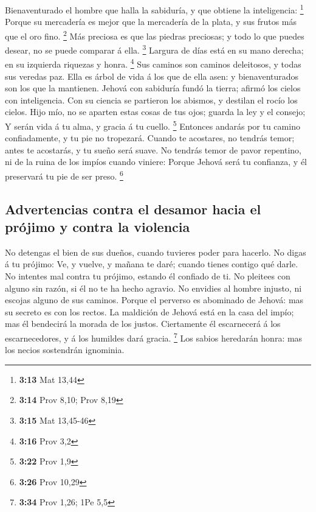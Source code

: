  Bienaventurado el hombre que halla la sabiduría, y que
obtiene la inteligencia: \footnote{\textbf{3:13} Mat 13,44}
 Porque su mercadería es mejor que la mercadería de la
plata, y sus frutos más que el oro fino. \footnote{\textbf{3:14} Prov
  8,10; Prov 8,19}  Más preciosa es que las piedras
preciosas; y todo lo que puedes desear, no se puede comparar á ella.
\footnote{\textbf{3:15} Mat 13,45-46}  Largura de días está
en su mano derecha; en su izquierda riquezas y honra. \footnote{\textbf{3:16}
  Prov 3,2}  Sus caminos son caminos deleitosos, y todas
sus veredas paz.  Ella es árbol de vida á los que de ella
asen: y bienaventurados son los que la mantienen.  Jehová
con sabiduría fundó la tierra; afirmó los cielos con inteligencia.
 Con su ciencia se partieron los abismos, y destilan el
rocío los cielos.  Hijo mío, no se aparten estas cosas de
tus ojos; guarda la ley y el consejo;  Y serán vida á tu
alma, y gracia á tu cuello. \footnote{\textbf{3:22} Prov 1,9}
 Entonces andarás por tu camino confiadamente, y tu pie no
tropezará.  Cuando te acostares, no tendrás temor; antes te
acostarás, y tu sueño será suave.  No tendrás temor de
pavor repentino, ni de la ruina de los impíos cuando viniere:
 Porque Jehová será tu confianza, y él preservará tu pie de
ser preso. \footnote{\textbf{3:26} Prov 10,29}

\hypertarget{advertencias-contra-el-desamor-hacia-el-pruxf3jimo-y-contra-la-violencia}{%
\subsection{Advertencias contra el desamor hacia el prójimo y contra la
violencia}\label{advertencias-contra-el-desamor-hacia-el-pruxf3jimo-y-contra-la-violencia}}

 No detengas el bien de sus dueños, cuando tuvieres poder
para hacerlo.  No digas á tu prójimo: Ve, y vuelve, y
mañana te daré; cuando tienes contigo qué darle.  No
intentes mal contra tu prójimo, estando él confiado de ti. 
No pleitees con alguno sin razón, si él no te ha hecho agravio.
 No envidies al hombre injusto, ni escojas alguno de sus
caminos.  Porque el perverso es abominado de Jehová: mas su
secreto es con los rectos.  La maldición de Jehová está en
la casa del impío; mas él bendecirá la morada de los justos.
 Ciertamente él escarnecerá á los escarnecedores, y á los
humildes dará gracia. \footnote{\textbf{3:34} Prov 1,26; 1Pe 5,5}
 Los sabios heredarán honra: mas los necios sostendrán
ignominia.

